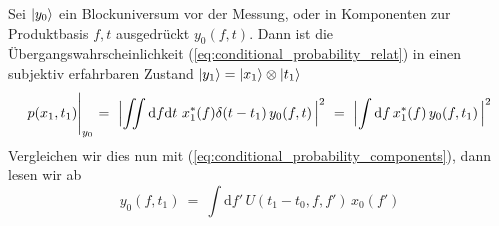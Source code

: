 \documentclass[12pt]{article}
\begin{document}
Sei $\ket{y_0}$ ein Blockuniversum vor der Messung, oder in Komponenten zur Produktbasis $f,t$ ausgedrückt $y_0(f,t)$. Dann ist die Übergangswahrscheinlichkeit (\ref{eq:conditional_probability_relat}) in einen subjektiv erfahrbaren Zustand $\ket{y_1} = \ket{x_1}\otimes\ket{t_1}$
\begin{equation} 
\label{eq:conditional_probability_subject}
p(x_1,t_1)\Biggl|_{y_0}\ =\ \Bigl| \iint \mathrm{d}f\mathrm{d}t\  x_1^*(f)\delta(t-t_1)\, y_0(f,t)\, \Bigr|^2
\ =\ \Bigl| \int \mathrm{d}f\, x_1^*(f)\, y_0(f,t_1)\, \Bigr|^2
\end{equation}
Vergleichen wir dies nun mit (\ref{eq:conditional_probability_components}), dann lesen wir ab
\begin{equation} 
y_0(f,t_1)\ =\ \int \mathrm{d}f'\, U(t_1-t_0,f,f')\, x_0(f')
\end{equation}
\end{document}
